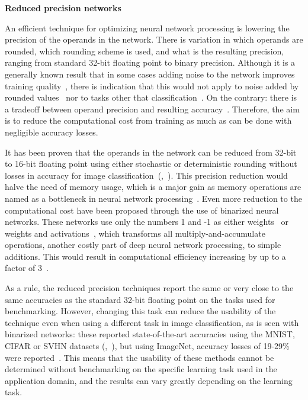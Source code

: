 \textbf{Reduced precision networks}

An efficient technique for optimizing neural network processing is lowering the precision of the operands in the network. There is variation in which operands are rounded, which rounding scheme is used, and what is the resulting precision, ranging from standard 32-bit floating point to binary precision. Although it is a generally known result that in some cases adding noise to the network improves training quality~\cite{murrayEnhancedMLPPerformance1994}, there is indication that this would not apply to noise added by rounded values~\cite{murrayEnhancedMLPPerformance1994} nor to tasks other that classification~\cite{anEffectsAddingNoise1996}. On the contrary: there is a tradeoff between operand precision and resulting accuracy~\cite{courbariauxTrainingDeepNeural2015}. Therefore, the aim is to reduce the computational cost from training as much as can be done with negligible accuracy losses.

It has been proven that the operands in the network can be reduced from 32-bit to 16-bit floating point using either stochastic or deterministic rounding without losses in accuracy for image classification~(\cite{pmlr-v37-gupta15},~\cite{micikeviciusMixedPrecisionTraining2018}). This precision reduction would halve the need of memory usage, which is a major gain as memory operations are named as a bottleneck in neural network processing~\cite{szeEfficientProcessingDeep2017}. Even more reduction to the computational cost have been proposed through the use of binarized neural networks. These networks use only the numbers 1 and -1 as either weights~\cite{courbariauxBinaryConnectTrainingDeep2016} or weights and activations~\cite{courbariauxBinarizedNeuralNetworks2016},  which transforms all multiply-and-accumulate operations, another costly part of deep neural network processing, to simple additions. This would result in computational efficiency increasing by up to a factor of 3~\cite{courbariauxBinaryConnectTrainingDeep2016}.

As a rule, the reduced precision techniques report the same or very close to the same accuracies as the standard 32-bit floating point on the tasks used for benchmarking. However, changing this task can reduce the usability of the technique even when using a different task in image classification, as is seen with binarized networks: these reported state-of-the-art accuracies using the MNIST, CIFAR or SVHN datasets (\cite{courbariauxBinarizedNeuralNetworks2016},~\cite{courbariauxBinaryConnectTrainingDeep2016}), but using ImageNet, accuracy losses of 19-29\% were reported~\cite{rastegariXNORNetImageNetClassification2016}. This means that the usability of these methods cannot be determined without benchmarking on the specific learning task used in the application domain, and the results can vary greatly depending on the learning task.

